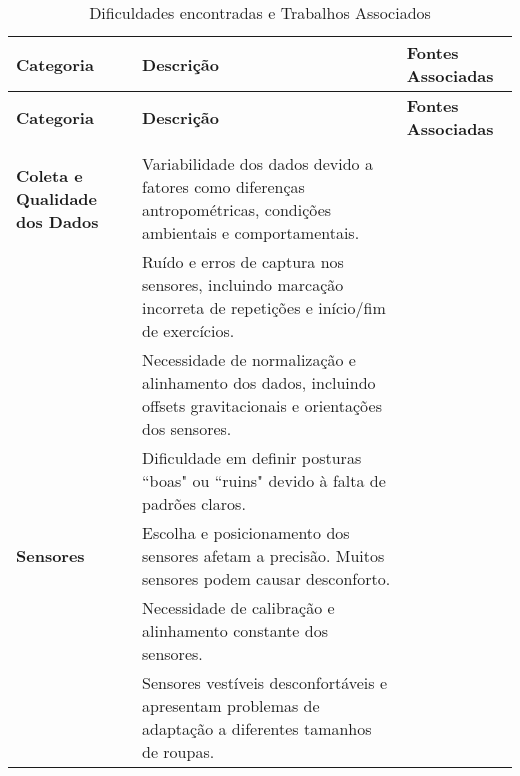 \documentclass[a4paper,12pt]{article}
\begin{document}
\renewcommand{\arraystretch}{1.5}
\setlength{\tabcolsep}{5pt}

\begin{longtable}{|p{3cm}|p{6cm}|p{3.4cm}|}
    \caption{Dificuldades encontradas e Trabalhos Associados} \label{tab:dificuldades} \\
\hline
\textbf{Categoria} & \textbf{Descrição} & \textbf{Fontes Associadas} \\ \hline
\endfirsthead

\hline
\textbf{Categoria} & \textbf{Descrição} & \textbf{Fontes Associadas} \\ \hline
\endhead

\hline
\endfoot

\multicolumn{3}{l}{}\\
\endlastfoot

\textbf{Coleta e Qualidade dos Dados} & Variabilidade dos dados devido a fatores como diferenças antropométricas, condições ambientais e comportamentais. &  \cite{colpitts2023kinematics, papadopoulou2023towards, Gleadhill2019, Kwon2021, Qi2020, colpitts2023kinematics, Ponton2023, Krauter2024} \\ \cline{2-3}
& Ruído e erros de captura nos sensores, incluindo marcação incorreta de repetições e início/fim de exercícios. & \cite{ Johnson2021, Tian2021, colpitts2023kinematics, Zhang2020, Gleadhill2019, Zou2020, Ceccarelli2024, Michaud2021} \\ \cline{2-3}
& Necessidade de normalização e alinhamento dos dados, incluindo offsets gravitacionais e orientações dos sensores. & \cite{Johnson2021, MallolRagolta2021, Moller2012, Simon2023, Michaud2021, Gleadhill2019} \\ \cline{2-3}
& Dificuldade em definir posturas ``boas" ou ``ruins" devido à falta de padrões claros. & \cite{Krauter2024, papadopoulou2023towards, Gleadhill2019} \\ \hline

\textbf{Sensores} & Escolha e posicionamento dos sensores afetam a precisão. Muitos sensores podem causar desconforto. & \cite{Johnson2021, Krauter2024, Tian2021, papadopoulou2023towards, Gleadhill2019} \\ \cline{2-3}
& Necessidade de calibração e alinhamento constante dos sensores. & \cite{Johnson2021, Ponton2023, Zhang2020, Krauter2024, Gleadhill2019, colpitts2023kinematics} \\ \cline{2-3}
& Sensores vestíveis desconfortáveis e apresentam problemas de adaptação a diferentes tamanhos de roupas. & \cite{Krauter2024, Qi2020, Tian2021, Johnson2021} \\ \hline


\end{longtable}
\end{document}
